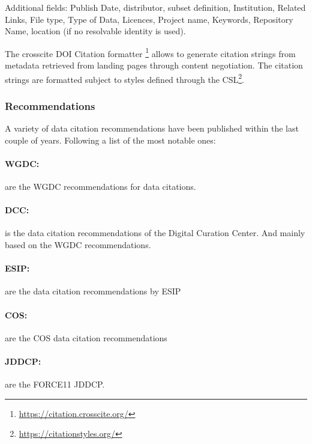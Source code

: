 \documentclass[a4paper,10pt]{article}
\begin{document}
Additional fields: 
Publish Date, distributor, subset definition, Institution, Related Links, File type, Type of Data, Licences, Project name, Keywords, Repository Name, location (if no resolvable identity is used).

The crosscite DOI Citation formatter \footnote{\url{https://citation.crosscite.org/}} allows to generate citation strings from metadata retrieved from landing pages through content negotiation.
The citation strings are formatted subject to styles defined through the \gls{CSL}\footnote{\url{https://citationstyles.org/}}.



\subsubsection{Recommendations}
A variety of data citation recommendations have been published within the last couple of years.
Following a list of the most notable ones:

\paragraph{\acrlong{WGDC}:}
\citep{Rauber2015} are the \gls{WGDC} recommendations for data citations.

\paragraph{\acrlong{DCC}:}
\citep{Ball2015} is the data citation recommendations of the Digital Curation Center. And mainly based on the \gls{WGDC} recommendations.

\paragraph{\acrlong{ESIP}:}
\citep{ESIP2012a} are the data citation recommendations by \gls{ESIP}

\paragraph{\acrlong{COS}:}
\citep{COS2015} are the \gls{COS} data citation recommendations

\paragraph{\acrlong{JDDCP}:}
\citep{Altman2015, Rauber2015, Fenner2016, Starr2015} are the FORCE11 \gls{JDDCP}.
\end{document}
